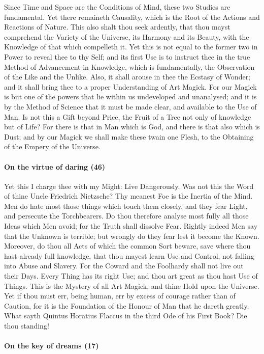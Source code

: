Since Time and Space are the Conditions of Mind, these two Studies are fundamental. Yet there remaineth Causality, which is the Root of the Actions and Reactions of Nature. This also shalt thou seek ardently, that thou mayst comprehend the Variety of the Universe, its Harmony and its Beauty, with the Knowledge of that which compelleth it. Yet this is not equal to the former two in Power to reveal thee to thy Self; and its first Use is to instruct thee in the true Method of Advancement in Knowledge, which is fundamentally, the Observation of the Like and the Unlike. Also, it shall arouse in thee the Ecstasy of Wonder; and it shall bring thee to a proper Understanding of Art Magick. For our Magick is but one of the powers that lie within us undeveloped and unanalysed; and it is by the Method of Science that it must be made clear, and available to the Use of Man. Is not this a Gift beyond Price, the Fruit of a Tree not only of knowledge but of Life? For there is that in Man which is God, and there is that also which is Dust; and by our Magick we shall make these twain one Flesh, to the Obtaining of the Empery of the Universe.

\paragraph{On the virtue of daring (46)}


Yet this I charge thee with my Might: Live Dangerously. Was not this the Word of thine Uncle Friedrich Nietzsche? Thy meanest Foe is the Inertia of the Mind. Men do hate most those things which touch them closely, and they fear Light, and persecute the Torchbearers. Do thou therefore analyse most fully all those Ideas which Men avoid; for the Truth shall dissolve Fear. Rightly indeed Men say that the Unknown is terrible; but wrongly do they fear lest it become the Known. Moreover, do thou all Acts of which the common Sort beware, save where thou hast already full knowledge, that thou mayest learn Use and Control, not falling into Abuse and Slavery. For the Coward and the Foolhardy shall not live out their Days. Every Thing has its right Use; and thou art great as thou hast Use of Things. This is the Mystery of all Art Magick, and thine Hold upon the Universe. Yet if thou must err, being human, err by excess of courage rather than of Caution, for it is the Foundation of the Honour of Man that he dareth greatly. What sayth Quintus Horatius Flaccus in the third Ode of his First Book? Die thou standing!

\paragraph{On the key of dreams (17)}


